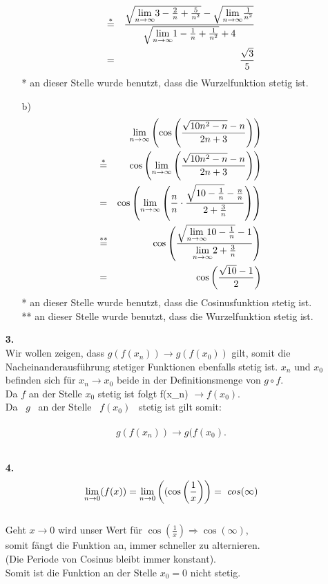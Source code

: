 \documentclass[a4paper,12pt]{article}
\begin{document}
\begin{enumerate}
\begin{enumerate}
\begin{align*}
                        & \overset{*}{=} & \frac{\sqrt{\underset{n \to \infty}{\lim} 3-\frac{2}{n}+\frac{5}{n^2}}-\sqrt{\underset{n \to \infty}{\lim} \frac{1}{n^2}}}
                        {\sqrt{\underset{n \to \infty}{\lim} 1-\frac{1}{n}+\frac{1}{n^2}}+4} \\
                        &=& \frac{\sqrt{3}}{5}
                    \end{align*}
                    * an dieser Stelle wurde benutzt, dass die Wurzelfunktion stetig ist.
                \item[b)]
                    \begin{align*}
                        &&\underset{n \to \infty}{\lim} \left( \cos \left( \frac{\sqrt{10n^2 -n}-n}{2n+3} \right) \right) \\
                        & \overset{*}{=} & \cos \left( \underset{n \to \infty}{\lim} \left( \frac{\sqrt{10n^2 -n}-n}{2n+3} \right) \right) \\
                        &=& \cos \left( \underset{n \to \infty}{\lim} \left( \frac{n}{n} \cdot \frac{\sqrt{10-\frac{1}{n}}-\frac{n}{n}}{2+\frac{3}{n}} \right) \right) \\
                        & \overset{**}{=} & \cos \left( \frac{\sqrt{\underset{n \to \infty}{\lim} 10-\frac{1}{n}}-1}{\underset{n \to \infty}{\lim} 2+\frac{3}{n}} \right) \\
                        &=& \cos \left( \frac{\sqrt{10}-1}{2} \right)
                    \end{align*}
                    * an dieser Stelle wurde benutzt, dass die Cosinusfunktion stetig ist. \\
                    ** an dieser Stelle wurde benutzt, dass die Wurzelfunktion stetig ist.
            \end{enumerate}
        \item[\textbf{3.}]    \ \\
                Wir wollen zeigen, dass  $g(f(x_n)) \rightarrow g(f(x_0))$  gilt,  somit die Nacheinanderausführung stetiger Funktionen ebenfalls stetig ist.
               $ x_n $ und  $x_0 $ befinden sich für  $x_n \rightarrow x_0 $ beide in der Definitionsmenge von  $g \circ f $.\\
                Da  $f $ an der Stelle  $x_0 $ stetig ist folgt  f(x_n) $\rightarrow f(x_0).$ \\
                Da \ $g$ \  an der Stelle \ $f(x_0)$ \  stetig ist gilt somit:\\ \\
                $$g(f(x_n)) \rightarrow g(f(x_0).$$\\
            

        \item[\textbf{4.}]
                $$ \underset{n \to 0}{\lim} (f(x)) = \underset{n \to 0}{\lim} \left((\cos\left(\frac{1}{x}\right)\right) = \ cos(\infty) $$ \\
                Geht  $x \rightarrow 0$  wird unser Wert für  $\cos(\frac{1}{x}) \Rightarrow \cos(\infty)$,
                \\somit fängt die Funktion an, immer schneller zu alternieren.\\ (Die Periode von Cosinus bleibt immer konstant). \\ Somit ist die Funktion an der Stelle $x_0 = 0$ nicht stetig.


\end{enumerate}
\end{document}
